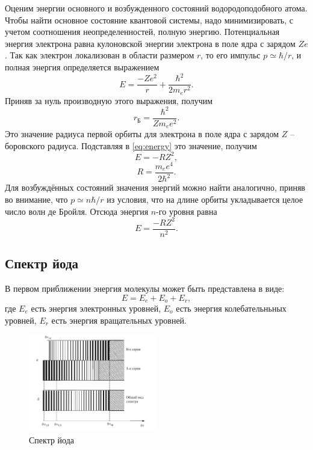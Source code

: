 \documentclass[a4paper, 12pt]{article}
\begin{document}
	Оценим энергии основного и возбужденного состояний водородоподобного атома. Чтобы найти основное состояние квантовой системы, надо минимизировать, с учетом соотношения неопределенностей, полную энергию. Потенциальная энергия электрона равна кулоновской энергии электрона в поле ядра с зарядом $ Z e $. Так как электрон локализован в области размером $ r $, то его импульс $ p \simeq \hbar / r $, и полная энергия определяется выражением
\begin{equation}\label{eq:energy}
		E = \dfrac{-Z e^2}{r}+\dfrac{\hbar^2}{2 m_e r^2}.
\end{equation}
Приняв за нуль производную этого выражения, получим
\begin{equation*}
	r_{\text{Б}} = \dfrac{\hbar^2}{Z m_e e^2}.
\end{equation*}
Это значение радиуса первой орбиты для электрона в поле ядра с зарядом $ Z $ -- боровского радиуса. Подставляя в \eqref{eq:energy} это значение, получим
\begin{equation*}
	E = -R Z^2,
\end{equation*}
\begin{equation}
	R = \dfrac{m_e e^4}{2 \hbar^2}.
\end{equation}
Для возбуждённых состояний значения энергий можно найти аналогично, приняв во внимание, что $ p \simeq n \hbar / r $ из условия, что на длине орбиты укладывается целое число волн де Бройля. Отсюда энергия $ n $-го уровня равна 
\begin{equation*}
	E = \dfrac{-R Z^2}{n^2}.
\end{equation*}

\subsection*{Спектр йода}
В первом приближении энергия молекулы может быть представлена в виде:
\begin{equation}
	E=E_e+E_o+E_r,
\end{equation}
где $E_e$ есть энергия электронных уровней, $E_o$ есть энергия колебательньных уровней, $E_r$ есть энергия вращательных уровней.


\begin{figure}[H]
    \centering
    \includegraphics[width=0.5\textwidth]{iod.png}
    \caption{Спектр йода}
    \label{fig:iod}
\end{figure}
\end{document}
